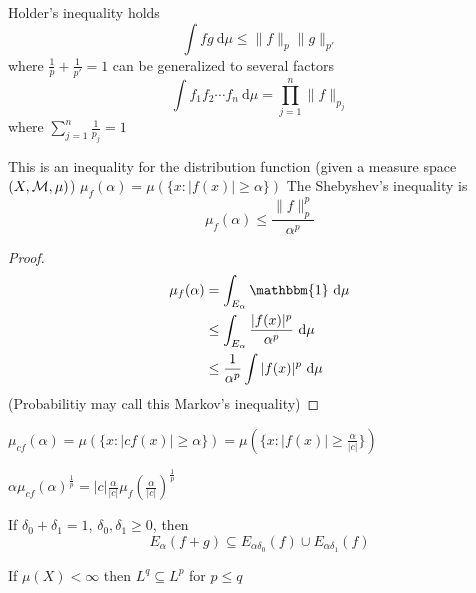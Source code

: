 \begin{remark}
  Holder's inequality holds
  \[\int fg\ \mathrm{d}\mu \le \|f\|_{p}\|g\|_{p'}\]
  where $\frac1p + \frac1{p'} = 1$ can be generalized to several factors
  \[\int f_1f_2\dotsm f_n\ \mathrm{d}\mu = \prod_{j=1}^n \|f\|_{p_j}\]
  where $\sum_{j=1}^n \frac1{p_j} = 1$
\end{remark}

\begin{lemma}
  This is an inequality for the distribution function (given a measure space $(X, \mathcal M, \mu)$) 
  $\mu_f(\alpha) = \mu(\{x : |f(x)| \ge \alpha\})$
  The Shebyshev's inequality is 
  \[\mu_f(\alpha) \le \frac{\|f\|_p^p}{\alpha^p}\]
\end{lemma}
\begin{proof}
  \begin{align*}
    \mu_f(\alpha) &= \int_{E_\alpha} \mathbbm{1} \ \mathrm{d}\mu \\
    &\le \int_{E_\alpha} \frac{|f(x)|^p}{\alpha^p}\ \mathrm{d}\mu \\
    &\le \frac1{\alpha^p}\int |f(x)|^p \ \mathrm{d}\mu \\
  \end{align*} 
  (Probabilitiy may call this Markov's inequality)
\end{proof}

$\mu_{cf}(\alpha) = \mu(\{x : |cf(x)| \ge \alpha\}) = \mu(\{x : |f(x)| \ge \frac{\alpha}{|c|}\})$

$\alpha\mu_{cf}(\alpha)^{\frac1p} = |c|\frac\alpha{|c|}\mu_f\left(\frac\alpha{|c|}\right)^{\frac1p} 
$


\begin{claim}
  If $\delta_0 + \delta_1 = 1$, $\delta_0, \delta_1 \ge 0$, then
  \[E_\alpha(f + g) \subseteq E_{\alpha\delta_0}(f) \cup E_{\alpha\delta_1}(f)\]
\end{claim}

\begin{theorem}
  If $\mu(X) < \infty$ then $L^q \subseteq L^p$ for $p \le q$ 
\end{theorem}

